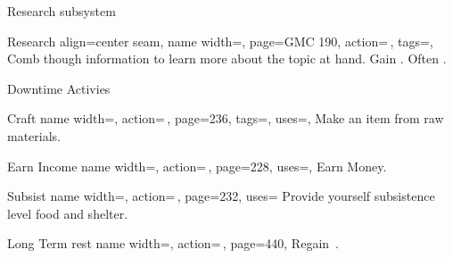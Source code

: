 \begin{PageFront}
\begin{Tables}{\frontTableHeight}
\begin{Table}{Research subsystem}
            \begin{entry}{Research}{%
                align=center seam,
                name width=\activityLength,%
                page=GMC 190,
                action=\,,
                tags=\Concentrate,
            }
                Comb though information to learn more about the topic at hand.
                Gain  .
                Often \Linguistic.\\
            \end{entry}
        \end{Table}
    \end{Tables}%
    \begin{Tables}{\frontTableHeight}
        \begin{Table}{Downtime Activies}
            \begin{entry}{Craft}{%
                name width=\activityLength,%
                action=\,\TimeDaily,
                page=236,
                tags=\Manipulate,
                uses={\Crafting[tags={T}]},
            }
                Make an item from raw materials.\hfill
            \end{entry}
            \begin{entry}{Earn Income}{%
                name width=\activityLength,%
                action=\,\TimeDaily,
                page=228,
                uses={},
            }
                Earn Money.
            \end{entry}
            \begin{entry}{Subsist}{%
                name width=\activityLength,%
                action=\,,
                page=232,
                uses={}
            }
                Provide yourself subsistence level food and shelter.\hfill
            \end{entry}
            \begin{entry}{Long Term rest}{%
                name width=\activityLength,%
                action=\,,
                page=440,
            }
                Regain \,\HPs. \quad

\end{entry}
\end{Table}
\end{Tables}
\end{PageFront}
